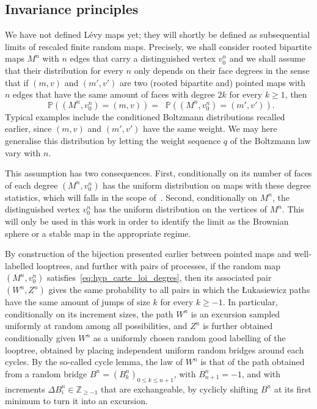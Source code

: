 \documentclass[british, a4paper,11pt]{article}
\numberwithin{equation}{section}
\theoremstyle{definition}
\renewcommand{\P}{\mathop{}\!\mathbb{P}}
\newcommand{\Z}{\mathbb{Z}}
\begin{document}
\subsection{Invariance principles}
\label{ssec:convergences}

We have not defined L\'evy maps yet; they will shortly be defined as subsequential limits of rescaled finite random maps. 
Precisely, we shall consider rooted bipartite maps $M^n$ with $n$ edges that carry a distinguished vertex $v^n_0$ and we shall assume that their distribution for every $n$ only depends on their face degrees in the sense that if $(m,v)$ and $(m', v')$ are two (rooted bipartite and) pointed maps with $n$ edges that have the same amount of faces with degree $2k$ for every $k \ge 1$, then
\begin{equation}\label{eq:hyp_carte_loi_degres}
\P((M^n, v^n_0) = (m,v)) = \P((M^n, v^n_0) = (m',v')).
\end{equation}
Typical examples include the conditioned Boltzmann distributions recalled earlier, since $(m,v)$ and $(m', v')$ have the same weight. We may here generalise this distribution by letting the weight sequence $q$ of the Boltzmann law vary with $n$.


This assumption has two consequences.
First, conditionally on its number of faces of each degree $(M^n, v^n_0)$ has the uniform distribution on maps with these degree statistics, which will falls in the scope of~\cite{Mar19,Mar24}.
Second, conditionally on $M^n$, the distinguished vertex $v^n_0$ has the uniform distribution on the vertices of $M^n$.
This will only be used in this work in order to identify the limit as the Brownian sphere or a stable map in the appropriate regime.

By construction of the bijection presented earlier between pointed maps and well-labelled looptrees, and further with pairs of processes, if the random map $(M^n, v^n_0)$ satisfies~\eqref{eq:hyp_carte_loi_degres}, then its associated pair $(W^n, Z^n)$ gives the same probability to all pairs in which the {\L}ukasiewicz paths have the same amount of jumps of size $k$ for every $k \ge -1$.
In particular, conditionally on its increment sizes, the path $W^n$ is an excursion sampled uniformly at random among all possibilities, and $Z^n$ is further obtained conditionally given $W^n$ as a uniformly chosen random good labelling of the looptree, obtained by placing independent uniform random bridges around each cycles.
By the so-called cycle lemma, the law of $W^n$ is that of the path obtained from a random bridge $B^{n} = (B^{n}_{k})_{0\leq k \leq n+1}$, with $B^{n}_{n+1}=-1$, and with increments $\Delta B^{n}_i \in \Z_{\ge-1}$ that are exchangeable, by cyclicly shifting $B^{n}$ at its first minimum to turn it into an excursion.
\end{document}
